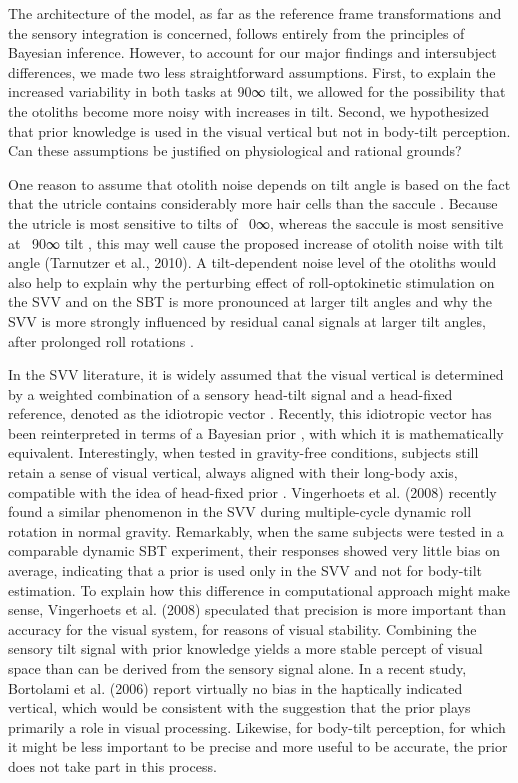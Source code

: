 The architecture of the model, as far as the reference frame transformations and the sensory integration is concerned, follows entirely from the principles of Bayesian inference. However, to account for our major findings and intersubject differences, we made two less straightforward assumptions. First, to explain the increased variability in both tasks at 90∞ tilt, we allowed for the possibility that the otoliths become more noisy with increases in tilt. Second, we hypothesized that prior knowledge is used in the visual vertical but not in body-tilt perception. Can these assumptions be justified on physiological and rational grounds? 

One reason to assume that otolith noise depends on tilt angle is based on the fact that the utricle contains considerably more hair cells than the saccule \cite{rosenhall1972, rosenhall1974}. Because the utricle is most sensitive to tilts of ~0∞, whereas the saccule is most sensitive at ~90∞ tilt \cite{jaeger2008}, this may well cause the proposed increase of otolith noise with tilt angle (Tarnutzer et al., 2010). A tilt-dependent noise level of the otoliths would also help to explain why the perturbing effect of roll-optokinetic stimulation on the SVV \cite{dichgans1974, fernandez1976} and on the SBT \cite{young1975} is more pronounced at larger tilt angles and why the SVV is more strongly influenced by residual canal signals at larger tilt angles, after prolonged roll rotations \cite{lorincz2008}.

In the SVV literature, it is widely assumed that the visual vertical is determined by a weighted combination of a sensory head-tilt signal and a head-fixed reference, denoted as the idiotropic vector \cite{mittelstaedt1983}. Recently, this idiotropic vector has been reinterpreted in terms of a Bayesian prior \cite{eggert1998, macneilage2007, devrijer2008}, with which it is mathematically equivalent. Interestingly, when tested in gravity-free conditions, subjects still retain a sense of visual vertical, always aligned with their long-body axis, compatible with the idea of head-fixed prior \cite{mittelstaedt1983}. Vingerhoets et al. (2008) recently found a similar phenomenon in the SVV during multiple-cycle dynamic roll rotation in normal gravity. Remarkably, when the same subjects were tested in a comparable dynamic SBT experiment, their responses showed very little bias on average, indicating that a prior is used only in the SVV and not for body-tilt estimation. To explain how this difference in computational approach might make sense, Vingerhoets et al. (2008) speculated that precision is more important than accuracy for the visual system, for reasons of visual stability. Combining the sensory tilt signal with prior knowledge yields a more stable percept of visual space than can be derived from the sensory signal alone. In a recent study, Bortolami et al. (2006) report virtually no bias in the haptically indicated vertical, which would be consistent with the suggestion that the prior plays primarily a role in visual processing. Likewise, for body-tilt perception, for which it might be less important to be precise and more useful to be accurate, the prior does not take part in this process. 

